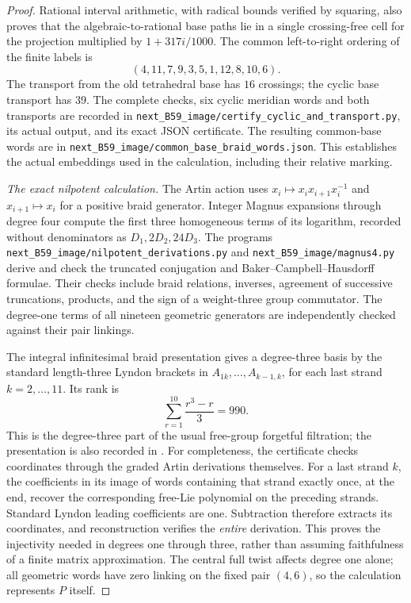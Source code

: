 \begin{proof}
Rational interval arithmetic, with radical bounds verified
by squaring, also proves that the algebraic-to-rational
base paths lie in a single crossing-free cell for the
projection multiplied by $1+317i/1000$.
The common left-to-right ordering of the finite labels is
\[
                   (4,11,7,9,3,5,1,12,8,10,6).
                                                               \tag{B.61.4}
\]
The transport from the old tetrahedral base has $16$
crossings; the cyclic base transport has $39$.
The complete checks, six cyclic meridian words and both
transports are recorded in
\nolinkurl{next_B59_image/certify_cyclic_and_transport.py},
its actual output, and its exact JSON certificate.
The resulting common-base words are in
\nolinkurl{next_B59_image/common_base_braid_words.json}.
This establishes the actual embeddings used in the
calculation, including their relative marking.

\emph{The exact nilpotent calculation.}
The Artin action uses
$x_i\mapsto x_ix_{i+1}x_i^{-1}$ and
$x_{i+1}\mapsto x_i$ for a positive braid generator.
Integer Magnus expansions through degree four compute
the first three homogeneous terms of its logarithm,
recorded without denominators as $D_1,2D_2,24D_3$.
The programs \nolinkurl{next_B59_image/nilpotent_derivations.py}
and \nolinkurl{next_B59_image/magnus4.py} derive and check
the truncated conjugation and Baker--Campbell--Hausdorff
formulae.  Their checks include braid relations, inverses,
agreement of successive truncations, products, and the
sign of a weight-three group commutator.
The degree-one terms of all nineteen geometric generators
are independently checked against their pair linkings.

The integral infinitesimal braid presentation gives a
degree-three basis by the standard length-three Lyndon
brackets in
$A_{1k},\ldots,A_{k-1,k}$, for each last strand
$k=2,\ldots,11$.
Its rank is
\[
                 \sum_{r=1}^{10}\frac{r^3-r}{3}=990.
                                                               \tag{B.61.5}
\]
This is the degree-three part of the usual free-group
forgetful filtration; the presentation is also recorded
in \citet[Section 3]{DE_KaabiVershinin2012}.
For completeness, the certificate checks coordinates
through the graded Artin derivations themselves.
For a last strand $k$, the coefficients in its image
of words containing that strand exactly once, at the end,
recover the corresponding free-Lie polynomial on the
preceding strands.  Standard Lyndon leading coefficients
are one.  Subtraction therefore extracts its coordinates,
and reconstruction verifies the \emph{entire} derivation.
This proves the injectivity needed in degrees one through
three, rather than assuming faithfulness of a finite
matrix approximation.
The central full twist affects degree one alone; all
geometric words have zero linking on the fixed pair
$(4,6)$, so the calculation represents $P$ itself.


\end{proof}
